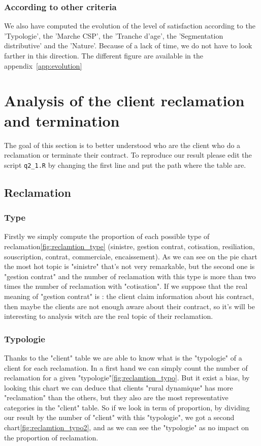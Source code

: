 \documentclass[a4paper, 11pt]{article}
\newcommand{\tw}[1]{\texttt{#1}}
\begin{document}
    \subsubsection{According to other criteria}
    We also have computed the evolution of the level of satisfaction according to the 'Typologie', the 'Marche CSP', the 'Tranche d'age', the 'Segmentation distributive' and the 'Nature'. Because of a lack of time, we do not have to look farther in this direction. The different figure are available in the appendix~\ref{app:evolution}
    
\section{Analysis of the client reclamation and termination}
	The goal of this section is to better understood who are the client who do a reclamation or terminate their contract. To reproduce our result please edit the script \tw{q2\_1.R} by changing the first line and put the path where the table are. 
    \subsection{Reclamation}
    
    	\subsubsection{Type}
    		Firstly we simply compute the proportion of each possible type of reclamation\ref{fig:reclamtion_type} (sinistre, gestion contrat, cotisation, resiliation, souscription, contrat, commerciale, encaissement). As we can see on the pie chart the most hot topic is "sinistre" that's not very remarkable, but the second one is "gestion contrat" and the number of reclamation with this type is more than two times the number of reclamation with "cotisation". If we suppose that the real meaning of "gestion contrat" is : the client claim information about his contract, then maybe the clients are not enough aware about their contract, so it's will be interesting to analysis witch are the real topic of their reclamation. 
            
       \subsubsection{Typologie}
       		Thanks to the "client" table we are able to know what is the "typologie" of a client for each reclamation. In a first hand we can simply count the number of reclamation for a given "typologie"\ref{fig:reclamtion_typo}. But it exist a bias, by looking this chart we can deduce that clients "rural dynamique" has more "reclamation" than the others, but they also are the most representative categories in the "client" table. So if we look in term of proportion, by dividing our result by the number of "client" with this "typologie", we got a second chart\ref{fig:reclamtion_typo2}, and as we can see the "typologie" as no impact on the proportion of reclamation.
            
\end{document}
